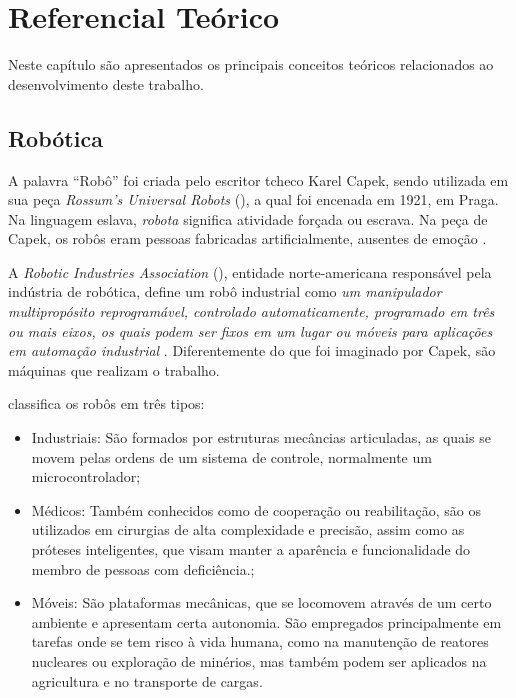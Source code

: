 
\chapter{Referencial Teórico} \label{cap:funda}

\vspace{-2cm} %

Neste capítulo são apresentados os principais conceitos teóricos relacionados ao desenvolvimento deste trabalho.


\vspace{1cm}
\section{Robótica} \label{cap:rob_auto}
A palavra ``Robô'' foi criada pelo escritor tcheco Karel Capek, sendo utilizada em sua peça 
\textit{Rossum's Universal Robots} (), a qual foi 
encenada em 1921, em Praga. Na linguagem eslava, \textit{robota} significa atividade 
forçada ou escrava. Na peça de Capek, os robôs eram pessoas fabricadas artificialmente, ausentes
de emoção \cite{polonskii1996}.\par
A \textit{Robotic Industries Association} (), 
entidade norte-americana responsável pela indústria de robótica, define um robô industrial como
 \textit{um manipulador multipropósito reprogramável, controlado automaticamente, programado em três 
 ou mais eixos, os quais podem ser fixos em um lugar ou móveis para aplicações em automação industrial} \cite{RIAdef}.
Diferentemente do que foi imaginado por Capek, são máquinas que realizam o trabalho.

 classifica os robôs em três tipos:
\begin{itemize}
 \item Industriais: São formados por estruturas mecâncias articuladas, as quais se movem pelas ordens de um sistema de 
 controle, normalmente um microcontrolador;
 \item Médicos: Também conhecidos como de cooperação ou reabilitação, são os utilizados em cirurgias de alta complexidade e 
 precisão, assim como as próteses inteligentes, que visam manter a aparência e funcionalidade do membro de pessoas com 
 deficiência.;
 \item Móveis: São plataformas mecânicas, que se locomovem através de um certo ambiente e apresentam certa autonomia.
São empregados principalmente em tarefas onde se tem risco à vida humana, como na manutenção de reatores nucleares ou 
exploração de 
minérios, mas também podem ser aplicados na agricultura e no transporte de cargas.
\end{itemize}


